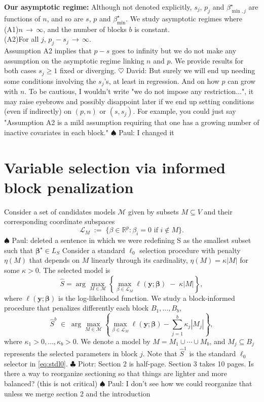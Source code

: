 \documentclass[aos]{imsart}
\theoremstyle{plain}
\newcommand{\david}[1]{{\small{\color{blue} \sf $\heartsuit$ David: #1}}}
\newcommand{\piotr}[1]{{\small{\color{red} \sf $\clubsuit$ Piotr: #1}}}
\newcommand{\paul}[1]{{\small{\color{green} \sf $\spadesuit$ Paul: #1}}}
\newcommand{\R}{\mathbb{R}}
\newcommand{\M}{\mathcal{M}}
\newcommand{\bs}{\boldsymbol}
\begin{document}
\noindent\textbf{Our asymptotic regime:} Although not denoted explicitly, $s_j$, $p_j$ and $\beta_{\min,j}^{\star}$ are  functions of $n$, and so are $s$, $p$ and $\beta_{\min}^{\star}$. We study asymptotic regimes where \\[5pt]
     (A1)\quad $n \,\to \, \infty$, and the number of blocks $b$ is constant. \\[5pt]
     (A2)\quad For all $j$, $p_j-s_j \,\to \, \infty$.\\[5pt]
Assumption A2 implies that $p-s$ goes to infinity but we do not make any assumption on the asymptotic regime linking $n$ and $p$. We provide results for both cases $s_j\geq1$ fixed or diverging.
\david{But surely we will end up needing some conditions involving the $s_j$'s, at least in regression. And on how $p$ can grow with $n$. To be cautious, I wouldn't write "we do not impose any restriction...", it may raise eyebrows and possibly disappoint later if we end up setting conditions (even if indirectly) on $(p,n)$ or $(s,s_j)$. For example, you could just say "Assumption A2 is a mild assumption requiring that one has a growing number of inactive covariates in each block."}\paul{I changed it}

\section{Variable selection via informed block penalization}\label{sec:intro_blockpen}

Consider a set of candidates models $\M$ given by subsets $M\subseteq V$ and their corresponding coordinate subspaces
$$
\mathcal{L}_M\;:=\;\{\beta\in \R^p: \beta_i=0\mbox{ if }i\notin M\}.
$$ \paul{deleted a sentence in which we were redefining S as the smallest subset such that $\bs\beta^\star\in L_S$}
Consider a standard $\ell_0$ selection procedure with penalty $\eta(M)$ that depends on $M$ linearly through its cardinality, $\eta(M)=\kappa |M|$ for some $\kappa>0$. The selected model is
\begin{equation}\label{eq:stdl0}
\hat{S}= \arg\max_{M\in \M} \left\{\max_{\beta\in \mathcal{L}_M}\ell(\bs y; \bs \beta)\;-\;\kappa |M|\right\},
\end{equation}
where $\ell(\bs y; \bs \beta)$ is the log-likelihood function. 
We study a block-informed procedure that penalizes differently each block $B_1,\ldots,B_b$,
\begin{equation}\label{eq:Mhat}
  \hat S^b\;\in\;\arg\max_{M\in \M} \left\{\max_{\beta\in \mathcal{L}_M}\ell(\bs y; \bs \beta)-\sum_{j=1}^b\kappa_j |M_j| \right\},
\end{equation}
where $\kappa_1>0,\ldots,\kappa_b>0$. We denote a model by $M=M_1\cup\cdots\cup M_b$, and $M_j\subseteq B_j$ represents the  selected parameters in block $j$.
Note that $\hat{S}^1$ is the standard $\ell_0$ selector in \eqref{eq:stdl0}.
\piotr{Section 2 is half-page. Section 3 takes 10 pages. Is there a way to reorganize sectioning so that things are lighter and more balanced? (this is not critical)}\paul{I don't see how we could reorganize that unless we merge section 2 and the introduction}
\end{document}
